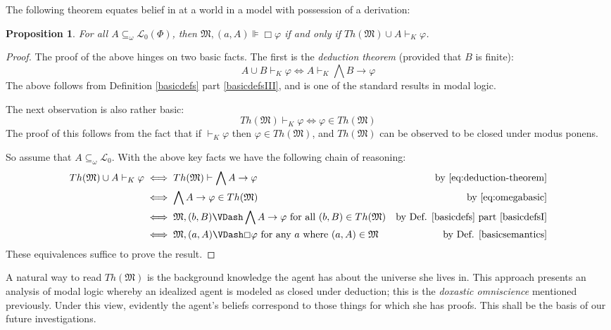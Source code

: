 \documentclass[11pt]{article}
\numberwithin{equation}{subsection}
\newtheorem{prop}[theorem]{Proposition}
\renewcommand{\Omega}{\mathfrak{M}}
\renewcommand{\phi}{\varphi}
\begin{document}
The following theorem equates belief in at a world in a model with
possession of a derivation:
\begin{prop}\label{central-prop}
 For all $A\subseteq_\omega \mathcal{L}_0(\Phi)$, then $\Omega, (a,A) \VDash \Box \phi$ if and only if $Th(\Omega) \cup A \vdash_K \phi$.
\end{prop}
\begin{proof}
The proof of the above hinges on two basic facts.  The first is the
\emph{deduction theorem} (provided that $B$ is finite):
\begin{equation}
A \cup B \vdash_K \phi \iff A \vdash_K \bigwedge B \to \phi \label{eq:deduction-theorem}
\end{equation}
The above follows from Definition
\ref{basicdefs} part \ref{basicdefsIII}, and is one of the standard results in
modal logic.

The next observation is also rather basic:
\begin{equation}
Th(\Omega) \vdash_K \phi \iff \phi \in Th(\Omega) \label{eq:omegabasic}
\end{equation}
The proof of this follows from the fact that if $\vdash_K \phi$ then
$\phi \in Th(\Omega)$, and $Th(\Omega)$ can be observed to be  closed under modus ponens.

So assume that $A \subseteq_\omega
\mathcal{L}_0$. With the above key facts we have the following chain
of reasoning:
\begin{align*}
  Th(\Omega) \cup A \vdash_K \phi & \iff   Th(\Omega) \vdash \bigwedge A
  \to \phi 
   & \textup{by \eqref{eq:deduction-theorem}} 
\\
 & \iff \bigwedge A \to \phi \in Th(\Omega) & \textup{by
   \eqref{eq:omegabasic}} \\
 & \iff \Omega, (b,B) \VDash \bigwedge A \to \phi \textup{ for all
   $(b,B) \in Th(\Omega)$} & \textup{by Def. \ref{basicdefs} part
   \ref{basicdefsI}} \\
 & \iff \Omega,(a,A) \VDash \Box \phi \textup{ for any $a$ where
   $(a,A) \in \Omega$} & \textup{by Def. \ref{basicsemantics}}
\end{align*}
These equivalences suffice to prove the result.
\end{proof}

A natural way to read $Th(\Omega)$ is the background knowledge the agent has about the universe she lives in.  This approach presents an analysis of modal logic whereby an idealized agent is modeled as closed under deduction; this is the \emph{doxastic omniscience} mentioned previously. Under this view, evidently the agent's beliefs correspond to those things for which she has proofs.  This shall be the basis of our future investigations.
\end{document}
